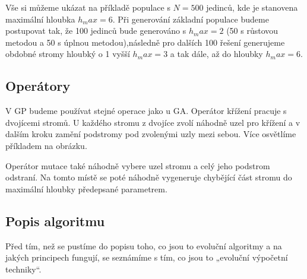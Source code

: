 \documentclass[bc,male,java,dept460]{diploma}		%
\begin{document}
Vše si můžeme ukázat na příkladě populace s $N=500$ jedinců, kde je stanovena maximální hloubka $h_max=6$. Při generování základní populace budeme postupovat tak, že 100 jedinců bude generováno s $h_max=2$ (50 s růstovou metodou a 50 s úplnou metodou),následně pro dalších 100 řešení generujeme obdobné stromy hloubký o 1 vyšší $h_max=3$ a tak dále, až do hloubky $h_max=6$.

\subsection{Operátory}
V GP budeme používat stejné operace jako u GA. Operátor křížení pracuje s dvojícemi stromů. U každého stromu z dvojíce zvolí náhodně uzel pro křížení a v dalším kroku zamění podstromy pod zvolenými uzly mezi sebou. Více osvětlíme příkladem na obrázku.

Operátor mutace také náhodně vybere uzel stromu a celý jeho podstrom odstraní. Na tomto místě se poté náhodně vygeneruje chybějící část stromu do maximální hloubky předepsané parametrem.


\subsection{Popis algoritmu}
Před tím, než se pustíme do popisu toho, co jsou to evoluční algoritmy a na jakých principech fungují, se seznámíme s tím, co jsou to „evoluční výpočetní techniky“.
\end{document}
